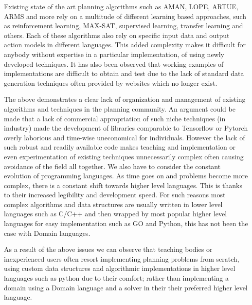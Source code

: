 Existing state of the art planning algorithms such as AMAN, LOPE, ARTUE, ARMS and more \cite{ReviewActionModels:article} rely on a multitude of different learning based approaches, such as reinforcement learning, MAX-SAT, supervised learning, transfer learning and others. Each of these algorithms also rely on specific input data and output action models in different languages. This added complexity makes it difficult for anybody without expertise in a particular implementation, of using newly developed techniques. It has also been observed that working examples of implementations are difficult to obtain and test due to the lack of standard data generation techniques often provided by websites which no longer exist.

The above demonstrates a clear lack of organization and management of existing algorithms and techniques in the planning community. An argument could be made that a lack of commercial appropriation of such niche techniques (in industry) made the development of libraries comparable to Tensorflow or Pytorch overly laborious and time-wise uneconomical for individuals. However the lack of such robust and readily available code makes teaching and implementation or even experimentation of existing techniques unnecessarily complex often causing avoidance of the field all together. We also have to consider the constant evolution of programming languages. As time goes on and problems become more complex, there is a constant shift towards higher level languages. This is thanks to their increased legibility and development speed. For such reasons most complex algorithms and data structures are usually written in lower level languages such as C/C++ and then wrapped by most popular higher level languages for easy implementation such as GO and Python, this has not been the case with Domain languages.

As a result of the above issues we can observe that teaching bodies or inexperienced users often resort implementing planning problems from scratch, using custom data structures and algorithmic implementations in higher level languages such as python due to their comfort; rather than implementing a domain using a Domain language and a solver in their their preferred higher level language.

